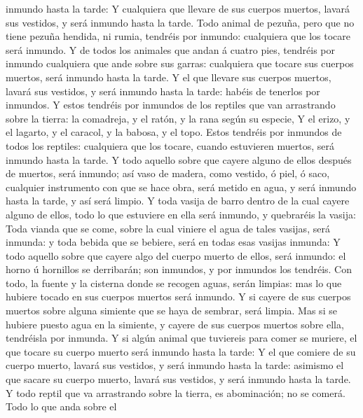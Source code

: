 inmundo hasta la tarde:  Y cualquiera que llevare de sus
cuerpos muertos, lavará sus vestidos, y será inmundo hasta la tarde.
 Todo animal de pezuña, pero que no tiene pezuña hendida,
ni rumia, tendréis por inmundo: cualquiera que los tocare será inmundo.
 Y de todos los animales que andan á cuatro pies,
tendréis por inmundo cualquiera que ande sobre sus garras: cualquiera
que tocare sus cuerpos muertos, será inmundo hasta la tarde.
 Y el que llevare sus cuerpos muertos, lavará sus
vestidos, y será inmundo hasta la tarde: habéis de tenerlos por
inmundos.  Y estos tendréis por inmundos de los reptiles
que van arrastrando sobre la tierra: la comadreja, y el ratón, y la rana
según su especie,  Y el erizo, y el lagarto, y el
caracol, y la babosa, y el topo.  Estos tendréis por
inmundos de todos los reptiles: cualquiera que los tocare, cuando
estuvieren muertos, será inmundo hasta la tarde.  Y todo
aquello sobre que cayere alguno de ellos después de muertos, será
inmundo; así vaso de madera, como vestido, ó piel, ó saco, cualquier
instrumento con que se hace obra, será metido en agua, y será inmundo
hasta la tarde, y así será limpio.  Y toda vasija de
barro dentro de la cual cayere alguno de ellos, todo lo que estuviere en
ella será inmundo, y quebraréis la vasija:  Toda vianda
que se come, sobre la cual viniere el agua de tales vasijas, será
inmunda: y toda bebida que se bebiere, será en todas esas vasijas
inmunda:  Y todo aquello sobre que cayere algo del cuerpo
muerto de ellos, será inmundo: el horno ú hornillos se derribarán; son
inmundos, y por inmundos los tendréis.  Con todo, la
fuente y la cisterna donde se recogen aguas, serán limpias: mas lo que
hubiere tocado en sus cuerpos muertos será inmundo.  Y si
cayere de sus cuerpos muertos sobre alguna simiente que se haya de
sembrar, será limpia.  Mas si se hubiere puesto agua en
la simiente, y cayere de sus cuerpos muertos sobre ella, tendréisla por
inmunda.  Y si algún animal que tuviereis para comer se
muriere, el que tocare su cuerpo muerto será inmundo hasta la tarde:
 Y el que comiere de su cuerpo muerto, lavará sus
vestidos, y será inmundo hasta la tarde: asimismo el que sacare su
cuerpo muerto, lavará sus vestidos, y será inmundo hasta la tarde.
 Y todo reptil que va arrastrando sobre la tierra, es
abominación; no se comerá.  Todo lo que anda sobre el

